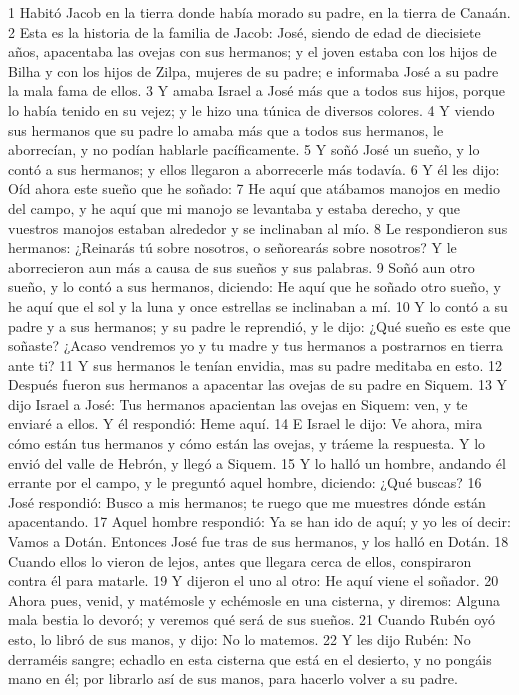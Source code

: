 1 Habitó Jacob en la tierra donde había morado su padre, en la tierra de Canaán.
2 Esta es la historia de la familia de Jacob: José, siendo de edad de diecisiete años, apacentaba las ovejas con sus hermanos; y el joven estaba con los hijos de Bilha y con los hijos de Zilpa, mujeres de su padre; e informaba José a su padre la mala fama de ellos.
3 Y amaba Israel a José más que a todos sus hijos, porque lo había tenido en su vejez; y le hizo una túnica de diversos colores.
4 Y viendo sus hermanos que su padre lo amaba más que a todos sus hermanos, le aborrecían, y no podían hablarle pacíficamente.
5 Y soñó José un sueño, y lo contó a sus hermanos; y ellos llegaron a aborrecerle más todavía.
6 Y él les dijo: Oíd ahora este sueño que he soñado:
7 He aquí que atábamos manojos en medio del campo, y he aquí que mi manojo se levantaba y estaba derecho, y que vuestros manojos estaban alrededor y se inclinaban al mío.
8 Le respondieron sus hermanos: ¿Reinarás tú sobre nosotros, o señorearás sobre nosotros? Y le aborrecieron aun más a causa de sus sueños y sus palabras.
9 Soñó aun otro sueño, y lo contó a sus hermanos, diciendo: He aquí que he soñado otro sueño, y he aquí que el sol y la luna y once estrellas se inclinaban a mí.
10 Y lo contó a su padre y a sus hermanos; y su padre le reprendió, y le dijo: ¿Qué sueño es este que soñaste? ¿Acaso vendremos yo y tu madre y tus hermanos a postrarnos en tierra ante ti?
11 Y sus hermanos le tenían envidia, mas su padre meditaba en esto.
12 Después fueron sus hermanos a apacentar las ovejas de su padre en Siquem.
13 Y dijo Israel a José: Tus hermanos apacientan las ovejas en Siquem: ven, y te enviaré a ellos. Y él respondió: Heme aquí.
14 E Israel le dijo: Ve ahora, mira cómo están tus hermanos y cómo están las ovejas, y tráeme la respuesta. Y lo envió del valle de Hebrón, y llegó a Siquem.
15 Y lo halló un hombre, andando él errante por el campo, y le preguntó aquel hombre, diciendo: ¿Qué buscas?
16 José respondió: Busco a mis hermanos; te ruego que me muestres dónde están apacentando.
17 Aquel hombre respondió: Ya se han ido de aquí; y yo les oí decir: Vamos a Dotán. Entonces José fue tras de sus hermanos, y los halló en Dotán.
18 Cuando ellos lo vieron de lejos, antes que llegara cerca de ellos, conspiraron contra él para matarle.
19 Y dijeron el uno al otro: He aquí viene el soñador.
20 Ahora pues, venid, y matémosle y echémosle en una cisterna, y diremos: Alguna mala bestia lo devoró; y veremos qué será de sus sueños.
21 Cuando Rubén oyó esto, lo libró de sus manos, y dijo: No lo matemos.
22 Y les dijo Rubén: No derraméis sangre; echadlo en esta cisterna que está en el desierto, y no pongáis mano en él; por librarlo así de sus manos, para hacerlo volver a su padre.
